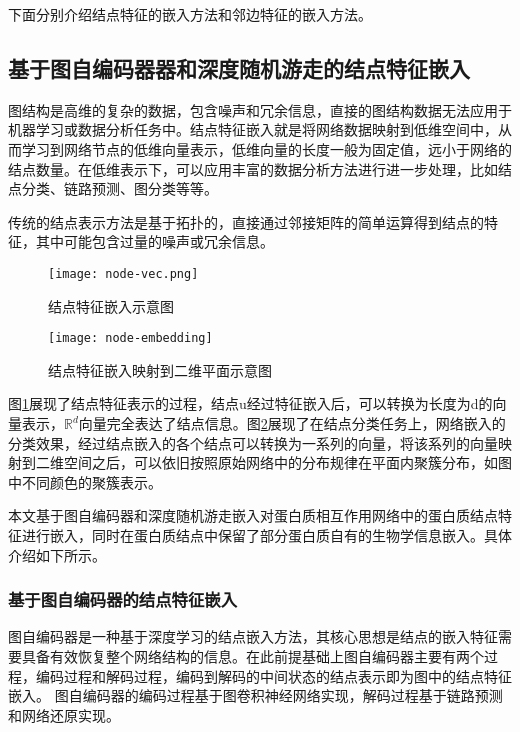 下面分别介绍结点特征的嵌入方法和邻边特征的嵌入方法。

\subsection{基于图自编码器器和深度随机游走的结点特征嵌入}
\label{subsection:featPPINetwork:nodeFeatConstruct}

图结构是高维的复杂的数据，包含噪声和冗余信息，直接的图结构数据无法应用于机器学习或数据分析任务中。结点特征嵌入就是将网络数据映射到低维空间中，从而学习到网络节点的低维向量表示，低维向量的长度一般为固定值，远小于网络的结点数量。在低维表示下，可以应用丰富的数据分析方法进行进一步处理，比如结点分类、链路预测、图分类等等。

传统的结点表示方法是基于拓扑的，直接通过邻接矩阵的简单运算得到结点的特征，其中可能包含过量的噪声或冗余信息。

\begin{figure}[htbp]
    \centering
    \texttt{[image: node-vec.png]}
    \caption{结点特征嵌入示意图}
    \label{fig:node-vec}
\end{figure}

\begin{figure}[htbp]
    \centering
    \texttt{[image: node-embedding]}
    \caption{结点特征嵌入映射到二维平面示意图}
    \label{fig:node-embedding}
\end{figure}

图\ref{fig:node-vec}展现了结点特征表示的过程，结点u经过特征嵌入后，可以转换为长度为d的向量表示，$\mathbb{R} ^d$向量完全表达了结点信息。图\ref{fig:node-embedding}展现了在结点分类任务上，网络嵌入的分类效果，经过结点嵌入的各个结点可以转换为一系列的向量，将该系列的向量映射到二维空间之后，可以依旧按照原始网络中的分布规律在平面内聚簇分布，如图中不同颜色的聚簇表示。

本文基于图自编码器和深度随机游走嵌入对蛋白质相互作用网络中的蛋白质结点特征进行嵌入，同时在蛋白质结点中保留了部分蛋白质自有的生物学信息嵌入。具体介绍如下所示。

\subsubsection{基于图自编码器的结点特征嵌入}

图自编码器是一种基于深度学习的结点嵌入方法，其核心思想是结点的嵌入特征需要具备有效恢复整个网络结构的信息。在此前提基础上图自编码器主要有两个过程，编码过程和解码过程，编码到解码的中间状态的结点表示即为图中的结点特征嵌入。
图自编码器的编码过程基于图卷积神经网络实现，解码过程基于链路预测和网络还原实现。

